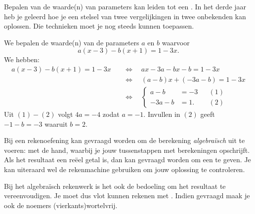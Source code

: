 \documentclass{ximera}
\begin{document}
Bepalen van de waarde(n) van parameters kan leiden tot een . 
In het derde jaar heb je geleerd hoe je een stelsel van twee vergelijkingen in twee onbekenden kan oplossen. Die technieken moet je nog steeds kunnen toepassen. 

\begin{example}
We bepalen de waarde(n) van de parameters $a$ en $b$ waarvoor
\[
a(x-3) - b(x+1) = 1-3x.
\]
We hebben:
\begin{align*}
a(x-3) - b(x+1) = 1-3x \quad 
& \Leftrightarrow \quad ax-3a-bx-b=1-3x \\
& \Leftrightarrow \quad (a-b)x +(-3a-b) = 1-3x \\
& \Leftrightarrow \quad
\left\{
\begin{aligned}
a - b & = -3 && (1)\\
-3a - b & = 1. && (2)
\end{aligned}
\right.
\end{align*}
Uit $(1)-(2)$ volgt $4a = -4$ zodat $a = -1$. Invullen in $(2)$ geeft $-1-b =  -3$ waaruit $b = 2$. 
\end{example}

Bij een rekenoefening kan gevraagd worden om de berekening {\em algebra\"isch} uit te voeren: met de hand, waarbij je jouw tussenstappen met berekeningen opschrijft. Als het resultaat een re\"eel getal is, dan kan gevraagd worden om een  te geven. Je kan uiteraard wel de rekenmachine gebruiken om jouw oplossing te controleren. 

Bij het algebra\"isch rekenwerk is het ook de bedoeling om het resultaat te vereenvoudigen. Je moet dus vlot kunnen rekenen met . 
Indien gevraagd maak je ook de noemers (vierkants)wortelvrij. 
\end{document}
